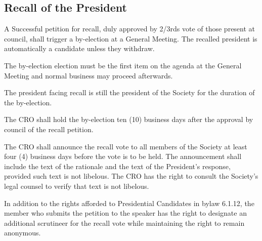\subsection{Recall of the President}
\begin{longenum}[ label*=\thesubsection.\arabic*., align=left]
	\item A Successful petition for recall, duly approved by 2/3rds vote of those present at council, shall trigger a by-election at a General Meeting. The recalled president is automatically a candidate unless they withdraw.
    \begin{longenum}[ label*=\arabic*., align=left]
		\item The by-election election must be the first item on the agenda at the General Meeting and normal business may proceed afterwards.
	\end{longenum}
    \item The president facing recall is still the president of the Society for the duration of the by-election.
    \item The CRO shall hold the by-election ten (10) business days after the approval by council of the recall petition.
    \item The CRO shall announce the recall vote to all members of the Society at least four (4) business days before the vote is to be held. The announcement shall include the text of the rationale and the text of the President's response, provided such text is not libelous. The CRO has the right to consult the Society's legal counsel to verify that text is not libelous.
    \item In addition to the rights afforded to Presidential Candidates in bylaw 6.1.12, the member who submits the petition to the speaker has the right to designate an additional scrutineer for the recall vote while maintaining the right to remain anonymous.
\end{longenum}
